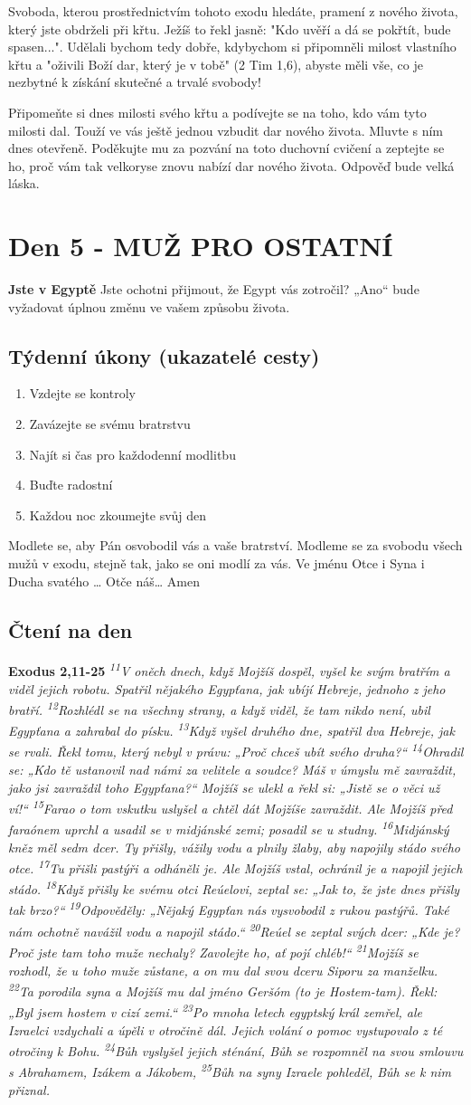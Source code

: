 \documentclass[11pt]{article}
\newcommand{\zacatekPrvniTyden}{
  \textbf{Jste v Egyptě} \newline
  Jste ochotni přijmout, že Egypt vás zotročil? „Ano“ bude vyžadovat úplnou změnu ve vašem způsobu života.

\subsection*{Týdenní úkony (ukazatelé cesty)}
\begin{enumerate}
  \item Vzdejte se kontroly
  \item Zavázejte se svému bratrstvu
  \item Najít si čas pro každodenní modlitbu
  \item Buďte radostní
  \item Každou noc zkoumejte svůj den
\end{enumerate}
Modlete se, aby Pán osvobodil vás a vaše bratrství. \newline
Modleme se za svobodu všech mužů v exodu, stejně tak, jako se oni modlí za vás.\newline
Ve jménu Otce i Syna i Ducha svatého …  Otče náš… Amen
}
\begin{document}
Svoboda, kterou prostřednictvím tohoto exodu hledáte, pramení z nového života, který jste obdrželi při křtu.
Ježíš to řekl jasně: "Kdo uvěří a dá se pokřtít, bude spasen...". Udělali bychom tedy dobře, kdybychom si připomněli milost vlastního křtu a "oživili Boží dar, který je v tobě" (2 Tim 1,6), abyste měli vše, co je nezbytné k získání skutečné a trvalé svobody!

Připomeňte si dnes milosti svého křtu a podívejte se na toho, kdo vám tyto milosti dal. Touží ve vás ještě jednou vzbudit dar nového života. Mluvte s ním dnes otevřeně. Poděkujte mu za pozvání na toto duchovní cvičení a zeptejte se ho, proč vám tak velkoryse znovu nabízí dar nového života. Odpověď bude velká láska.

\newpage
\section{Den 5 - MUŽ PRO OSTATNÍ}
\zacatekPrvniTyden
\subsection*{Čtení na den}
\textbf{Exodus 2,11-25}
\newline
\textit{
\textsuperscript{11}V oněch dnech, když Mojžíš dospěl, vyšel ke svým bratřím a viděl jejich robotu. Spatřil nějakého Egypťana, jak ubíjí Hebreje, jednoho z jeho bratří.
\textsuperscript{12}Rozhlédl se na všechny strany, a když viděl, že tam nikdo není, ubil Egypťana a zahrabal do písku.
\textsuperscript{13}Když vyšel druhého dne, spatřil dva Hebreje, jak se rvali. Řekl tomu, který nebyl v právu: „Proč chceš ubít svého druha?“
\textsuperscript{14}Ohradil se: „Kdo tě ustanovil nad námi za velitele a soudce? Máš v úmyslu mě zavraždit, jako jsi zavraždil toho Egypťana?“ Mojžíš se ulekl a řekl si: „Jistě se o věci už ví!“
\textsuperscript{15}Farao o tom vskutku uslyšel a chtěl dát Mojžíše zavraždit. Ale Mojžíš před faraónem uprchl a usadil se v midjánské zemi; posadil se u studny.
\textsuperscript{16}Midjánský kněz měl sedm dcer. Ty přišly, vážily vodu a plnily žlaby, aby napojily stádo svého otce.
\textsuperscript{17}Tu přišli pastýři a odháněli je. Ale Mojžíš vstal, ochránil je a napojil jejich stádo.
\textsuperscript{18}Když přišly ke svému otci Reúelovi, zeptal se: „Jak to, že jste dnes přišly tak brzo?“
\textsuperscript{19}Odpověděly: „Nějaký Egypťan nás vysvobodil z rukou pastýřů. Také nám ochotně navážil vodu a napojil stádo.“
\textsuperscript{20}Reúel se zeptal svých dcer: „Kde je? Proč jste tam toho muže nechaly? Zavolejte ho, ať pojí chléb!“
\textsuperscript{21}Mojžíš se rozhodl, že u toho muže zůstane, a on mu dal svou dceru Siporu za manželku. 
\textsuperscript{22}Ta porodila syna a Mojžíš mu dal jméno Geršóm (to je Hostem-tam). Řekl: „Byl jsem hostem v cizí zemi.“
\textsuperscript{23}Po mnoha letech egyptský král zemřel, ale Izraelci vzdychali a úpěli v otročině dál. Jejich volání o pomoc vystupovalo z té otročiny k Bohu.
\textsuperscript{24}Bůh vyslyšel jejich sténání, Bůh se rozpomněl na svou smlouvu s Abrahamem, Izákem a Jákobem,
\textsuperscript{25}Bůh na syny Izraele pohleděl, Bůh se k nim přiznal.
}
\end{document}
